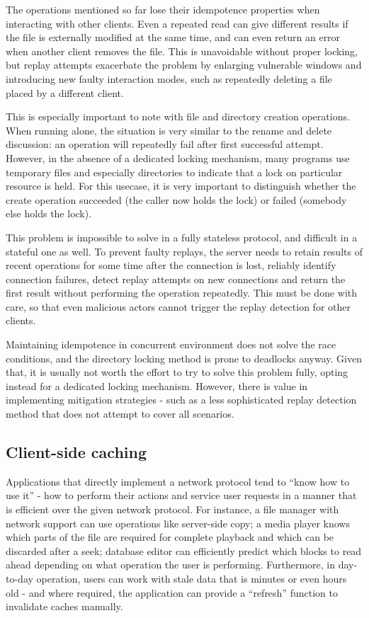 The operations mentioned so far lose their idempotence properties when interacting with other clients. Even
a repeated read can give different results if the file is externally modified at the same time, and can even
return an error when another client removes the file. This is unavoidable without proper locking, but replay
attempts exacerbate the problem by enlarging vulnerable windows and introducing new faulty interaction modes,
such as repeatedly deleting a file placed by a different client.

This is especially important to note with file and directory creation operations. When running alone, the
situation is very similar to the rename and delete discussion: an operation will repeatedly fail after first
successful attempt. However, in the absence of a dedicated locking mechanism, many programs use temporary
files and especially directories to indicate that a lock on particular resource is held.  For this usecase, it
is very important to distinguish whether the create operation succeeded (the caller now holds the lock) or
failed (somebody else holds the lock).

This problem is impossible to solve in a fully stateless protocol, and difficult in a stateful one as well. To
prevent faulty replays, the server needs to retain results of recent operations for some time after the
connection is lost, reliably identify connection failures, detect replay attempts on new connections and
return the first result without performing the operation repeatedly. This must be done with care, so that even
malicious actors cannot trigger the replay detection for other clients.

Maintaining idempotence in concurrent environment does not solve the race conditions, and the directory
locking method is prone to deadlocks anyway. Given that, it is usually not worth the effort to try to solve
this problem fully, opting instead for a dedicated locking mechanism. However, there is value in implementing
mitigation strategies - such as a less sophisticated replay detection method that does not attempt to cover
all scenarios.


\subsection{Client-side caching}

Applications that directly implement a network protocol tend to ``know how to use it'' - how to perform their
actions and service user requests in a manner that is efficient over the given network protocol. For instance,
a file manager with network support can use operations like server-side copy; a media player knows which parts
of the file are required for complete playback and which can be discarded after a seek; database editor can
efficiently predict which blocks to read ahead depending on what operation the user is performing.
Furthermore, in day-to-day operation, users can work with stale data that is minutes or even hours old - and
where required, the application can provide a ``refresh'' function to invalidate caches manually.

